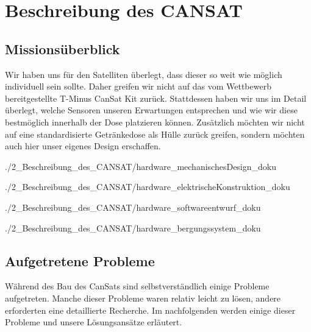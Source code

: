 \section{Beschreibung des CANSAT}


\subsection{Missionsüberblick}
Wir haben uns für den Satelliten überlegt, dass dieser so weit wie möglich individuell sein sollte. Daher greifen wir nicht auf das vom Wettbewerb bereitgestellte T-Minus CanSat Kit zurück. Stattdessen haben wir uns im Detail überlegt, welche Sensoren unseren Erwartungen entsprechen und wie wir diese bestmöglich innerhalb der Dose platzieren können. Zusätzlich möchten wir nicht auf eine standardisierte Getränkedose als Hülle zurück greifen, sondern möchten auch hier unser eigenes Design erschaffen.

 {./2_Beschreibung_des_CANSAT/hardware_mechanischesDesign_doku}

 {./2_Beschreibung_des_CANSAT/hardware_elektrischeKonstruktion_doku}

 {./2_Beschreibung_des_CANSAT/hardware_softwareentwurf_doku}

 {./2_Beschreibung_des_CANSAT/hardware_bergungssystem_doku}

\subsection{Aufgetretene Probleme}
Während des Bau des CanSats sind selbstverständlich einige Probleme aufgetreten. Manche dieser Probleme waren relativ leicht zu lösen, andere erforderten eine detaillierte Recherche. Im nachfolgenden werden einige dieser Probleme und unsere Lösungsansätze erläutert.

